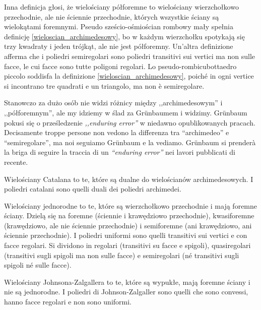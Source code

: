 Inna definicja głosi, że wielościany półforemne to wielościany wierzchołkowo przechodnie, ale nie ściennie przechodnie, których wszystkie ściany są wielokątami foremnymi. %
Pseudo sześcio-ośmiościan rombowy mały spełnia definicję \ref{wieloscian_archimedesowy}, bo w każdym wierzchołku spotykają się trzy kwadraty i jeden trójkąt, ale nie jest półforemny. %
Un'altra definizione afferma che i poliedri semiregolari sono poliedri transitivi sui vertici ma non sulle facce, le cui facce sono tutte poligoni regolari. %
Lo pseudo-rombicubottaedro piccolo soddisfa la definizione \ref{wieloscian_archimedesowy}, poiché in ogni vertice si incontrano tre quadrati e un triangolo, ma non è semiregolare. %

Stanowczo za dużo osób nie widzi różnicy między ,,archimedesowym'' i ,,półforemnym'', ale my idziemy w ślad za Grünbaumem \cite{grunbaum_2009} i widzimy. %
Grünbaum pokusi się o prześledzenie \emph{,,enduring error''} w niedawno opublikowanych pracach. %
Decisamente troppe persone non vedono la differenza tra ``archimedeo'' e ``semiregolare'', ma noi seguiamo Grünbaum \cite{grunbaum_2009} e la vediamo. %
Grünbaum si prenderà la briga di seguire la traccia di un \emph{``enduring error''} nei lavori pubblicati di recente. %

\begin{definition}
    Wielościany Catalana to te, które są dualne do wielościanów archimedesowych. %
    I poliedri catalani sono quelli duali dei poliedri archimedei. %
\end{definition}

\begin{definition}
    Wielościany jednorodne to te, które są wierzchołkowo przechodnie i mają foremne ściany. Dzielą się na foremne (ściennie i krawędziowo przechodnie), kwasiforemne (krawędziowo, ale nie ściennie przechodnie) i semiforemne (ani krawędziowo, ani ściennie przechodnie). %
    I poliedri uniformi sono quelli transitivi sui vertici e con facce regolari. Si dividono in regolari (transitivi su facce e spigoli), quasiregolari (transitivi sugli spigoli ma non sulle facce) e semiregolari (né transitivi sugli spigoli né sulle facce). %
\end{definition}

\begin{definition}
    Wielościany Johnsona-Zalgallera to te, które są wypukłe, mają foremne ściany i nie są jednorodne. %
    I poliedri di Johnson-Zalgaller sono quelli che sono convessi, hanno facce regolari e non sono uniformi. %
\end{definition}

